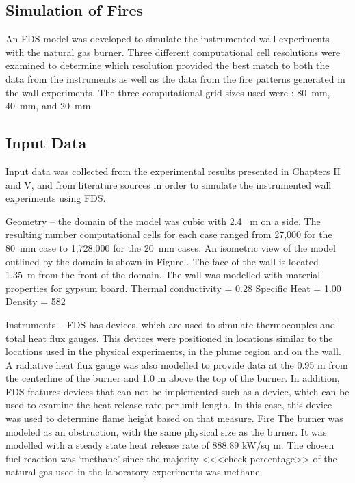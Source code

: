 \documentclass[twoside]{uocthesis}
\begin{document}
\subsection{Simulation of Fires}

An FDS model was developed to simulate the instrumented wall experiments with the natural gas burner.  Three different computational cell resolutions were examined to determine which resolution provided the best match to both the data from the instruments as well as the data from the fire patterns generated in the wall experiments.  The three computational grid sizes used were : 80~mm, 40~mm, and 20~mm. 

\subsection{Input Data}

Input data was collected from the experimental results presented in Chapters II and V, and from literature sources in order to simulate the instrumented wall experiments using FDS. 

Geometry – the domain of the model was cubic with 2.4~ m on a side.  The resulting number computational cells for each case ranged from 27,000 for the 80~mm case to 1,728,000 for the 20~mm cases.   An isometric view of the model outlined by the domain is shown in Figure     .  The face of the wall is located 1.35~m from the front of the domain.  
The wall was modelled with material properties for gypsum board.
Thermal conductivity = 0.28
Specific Heat = 1.00
Density = 582

Instruments – FDS has devices, which are used to simulate thermocouples and total heat flux gauges.  This devices were positioned  in locations similar to the locations used in the physical experiments, in the plume region and on the wall.   A radiative heat flux gauge was also modelled to provide data at the 0.95 m from the centerline of the burner and 1.0 m above the top of the burner.  
In addition, FDS features devices that can not be implemented such as a device, which can be used to examine the heat release rate per unit length.  In this case, this device was used to determine flame height based on that measure.     
Fire 
The burner was modeled as an obstruction, with the same physical size as the burner.  It was modelled with a steady state heat release rate of 888.89 kW/sq m.   The chosen fuel reaction was `methane’ since the majority <<<check percentage>> of the natural gas used in the laboratory experiments was methane.  
\end{document}
